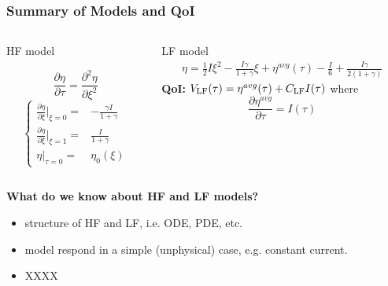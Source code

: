 \documentclass[10pt,xcolor=dvipsnames,compress]{beamer}
\begin{document}
\begin{frame}
\frametitle{Summary of Models and QoI}
\vfill

\begin{columns}
\begin{column}{.35\textwidth} 
\begin{problock}{HF model}

\begin{equation*}\label{eq:HF}
\frac{\partial\eta}{\partial\tau} = \frac{\partial^2\eta}{\partial\xi^2}
\end{equation*}
\begin{equation*}
\left\{\begin{matrix}
\frac{\partial\eta}{\partial\xi}|_{\xi=0} = & -\frac{\gamma I}{1+\gamma}\\
\frac{\partial\eta}{\partial\xi}|_{\xi=1} = & \frac{I}{1+\gamma} \nonumber\\
\eta|_{\tau=0} 	 =  & \eta_0(\xi)
\end{matrix}\right.
\end{equation*}

\end{problock}
\end{column}
\begin{column}{.6\textwidth}
\begin{block}{LF model}
\begin{eqnarray*}
\eta = 
\frac{1}{2}I\xi^2 - \frac{I \gamma}{1+\gamma}\xi +
{\eta}^{avg}(\tau) - \frac{I}{6} + \frac{I\gamma}{2(1+\gamma)}
\end{eqnarray*}
%
\textbf{QoI:}
$
V_{\rm LF}(\tau) = {\eta}^{avg}(\tau) + C_{\rm LF} I(\tau)
$
where
\begin{equation*}
\frac{\partial{\eta}^{avg}}{\partial\tau} = I(\tau)
\end{equation*}
\end{block}

\end{column}
\end{columns}

\vspace{0.5in}

\begin{center}
\textbf{What do we know about HF and LF models?}
\end{center}

\begin{itemize}
\item structure of HF and LF, i.e. ODE, PDE, etc.
\item model respond in a simple (unphysical) case, e.g. constant current. 
\item XXXX


\end{itemize}



\vfill
\end{frame}
\end{document}
